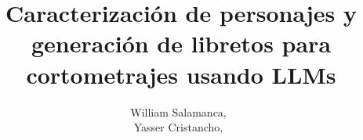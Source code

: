 \documentclass[journal,onecolumn]{IEEEtran}
\begin{document}
		
	
		\title{Caracterización de personajes y generación de libretos para cortometrajes usando LLMs}
		
		\author{William Salamanca,~\\
			Yasser Cristancho,~}%
		
	
\end{document}
